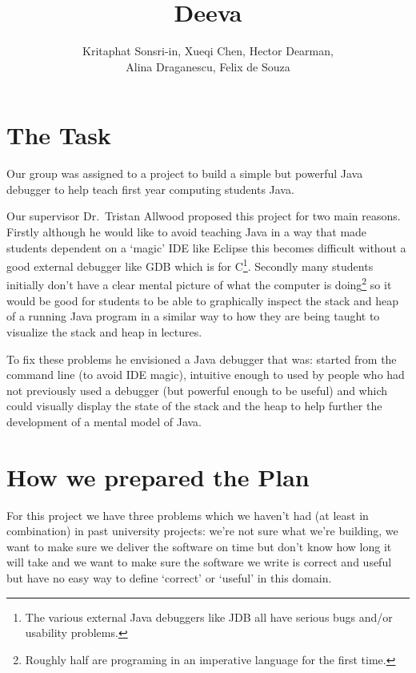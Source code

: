 \documentclass[11pt, a4paper]{article}
\newcommand{\subtitle}[1]{
  \posttitle{
    \par\end{center}
    \begin{center}\large#1\end{center}
    \vskip0.5em}
}
\begin{document}
\title{Deeva}
\subtitle{Planning Report}
\author{Kritaphat Sonsri-in, Xueqi Chen, Hector Dearman, \\Alina Draganescu, Felix de Souza}

\maketitle

\section{The Task}
Our group was assigned to a project to build a simple but powerful Java debugger to help teach first year computing students Java.

Our supervisor Dr.~Tristan Allwood proposed this project for two main reasons.
Firstly although he would like to avoid teaching Java in a way that made students dependent on a `magic' IDE like Eclipse this becomes difficult without a good external debugger like GDB which is for C\footnote{The various external Java debuggers like JDB all have serious bugs and/or usability problems.}.
Secondly many students initially don't have a clear mental picture of what the computer is doing\footnote{Roughly half are programing in an imperative language for the first time.} so it would be good for students to be able to graphically inspect the stack and heap of a running Java program in a similar way to how they are being taught to visualize the stack and heap in lectures.

To fix these problems he envisioned a Java debugger that was: started from the command line (to avoid IDE magic), intuitive enough to used by people who had not previously used a debugger (but powerful enough to be useful) and which could visually display the state of the stack and the heap to help further the development of a mental model of Java.

\section{How we prepared the Plan}

For this project we have three problems which we haven't had (at least in combination) in past university projects: we're not sure what we're building, we want to make sure we deliver the software on time but don't know how long it will take and
we want to make sure the software we write is correct and useful but have no easy way to define `correct' or `useful' in this domain.
\end{document}
